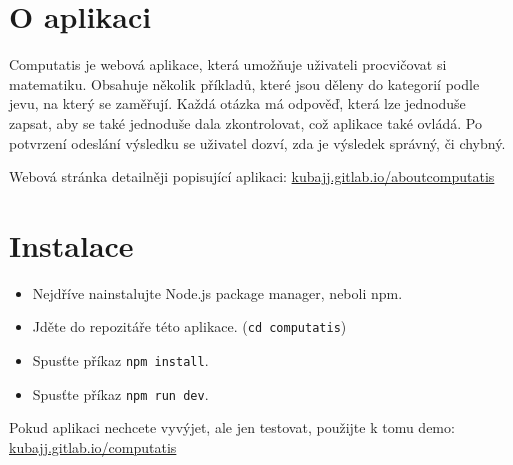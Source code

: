 \documentclass[
]{article}
\date{}
\begin{document}

\tableofcontents
\newpage

\section{O aplikaci}
Computatis je webová aplikace, která umožňuje uživateli procvičovat si matematiku.
Obsahuje několik příkladů, které jsou děleny do kategorií podle jevu, na který se zaměřují.
Každá otázka má odpověď, která lze jednoduše zapsat, aby se také jednoduše dala zkontrolovat,
což aplikace také ovládá. Po potvrzení odeslání výsledku se uživatel dozví, zda je výsledek správný, či chybný.

Webová stránka detailněji popisující aplikaci: 
\href{https://kubajj.gitlab.io/aboutcomputatis}{kubajj.gitlab.io/aboutcomputatis}

\section{Instalace}
\begin{itemize}
\item Nejdříve nainstalujte Node.js package manager, neboli npm.
\item Jděte do repozitáře této aplikace. (\texttt{cd\ computatis})
\item Spusťte příkaz \texttt{npm\ install}.
\item Spusťte příkaz \texttt{npm\ run\ dev}.
\end{itemize}
Pokud aplikaci nechcete vyvýjet, ale jen testovat, použijte k tomu demo:
\href{https://kubajj.gitlab.io/computatis}{kubajj.gitlab.io/computatis}
\end{document}
